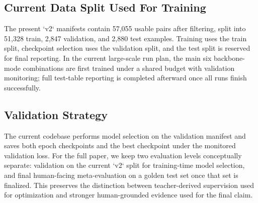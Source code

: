 \subsection{Current Data Split Used For Training}
The present `v2` manifests contain 57,055 usable pairs after filtering, split into 51,328 train, 2,847 validation, and 2,880 test examples. Training uses the train split, checkpoint selection uses the validation split, and the test split is reserved for final reporting. In the current large-scale run plan, the main six backbone-mode combinations are first trained under a shared budget with validation monitoring; full test-table reporting is completed afterward once all runs finish successfully.

\subsection{Validation Strategy}
The current codebase performs model selection on the validation manifest and saves both epoch checkpoints and the best checkpoint under the monitored validation loss. For the full paper, we keep two evaluation levels conceptually separate: validation on the current `v2` split for training-time model selection, and final human-facing meta-evaluation on a golden test set once that set is finalized. This preserves the distinction between teacher-derived supervision used for optimization and stronger human-grounded evidence used for the final claim.
